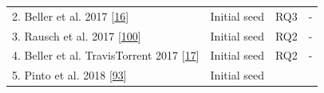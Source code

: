 \documentclass[]{book}
\begin{document}
\begin{longtable}[]{@{}llll@{}}
\begin{minipage}[t]{0.48\columnwidth}\raggedright\strut
2. Beller et al. 2017
{[}\protect\hyperlink{ref-beller2017oops}{16}{]}\strut
\end{minipage} & \begin{minipage}[t]{0.20\columnwidth}\raggedright\strut
Initial seed\strut
\end{minipage} & \begin{minipage}[t]{0.14\columnwidth}\raggedright\strut
RQ3\strut
\end{minipage} & \begin{minipage}[t]{0.06\columnwidth}\raggedright\strut
-\strut
\end{minipage}\tabularnewline
\begin{minipage}[t]{0.48\columnwidth}\raggedright\strut
3. Rausch et al. 2017
{[}\protect\hyperlink{ref-rausch2017empirical}{100}{]}\strut
\end{minipage} & \begin{minipage}[t]{0.20\columnwidth}\raggedright\strut
Initial seed\strut
\end{minipage} & \begin{minipage}[t]{0.14\columnwidth}\raggedright\strut
RQ2\strut
\end{minipage} & \begin{minipage}[t]{0.06\columnwidth}\raggedright\strut
-\strut
\end{minipage}\tabularnewline
\begin{minipage}[t]{0.48\columnwidth}\raggedright\strut
4. Beller et al. TravisTorrent 2017
{[}\protect\hyperlink{ref-beller2017travistorrent}{17}{]}\strut
\end{minipage} & \begin{minipage}[t]{0.20\columnwidth}\raggedright\strut
Initial seed\strut
\end{minipage} & \begin{minipage}[t]{0.14\columnwidth}\raggedright\strut
RQ2\strut
\end{minipage} & \begin{minipage}[t]{0.06\columnwidth}\raggedright\strut
-\strut
\end{minipage}\tabularnewline
\begin{minipage}[t]{0.48\columnwidth}\raggedright\strut
5. Pinto et al. 2018
{[}\protect\hyperlink{ref-pinto2018work}{93}{]}\strut
\end{minipage} & \begin{minipage}[t]{0.20\columnwidth}\raggedright\strut
Initial seed\strut
\end{minipage} & \begin{minipage}[t]{0.14\columnwidth}\raggedright\strut

\end{minipage}
\end{longtable}
\end{document}
